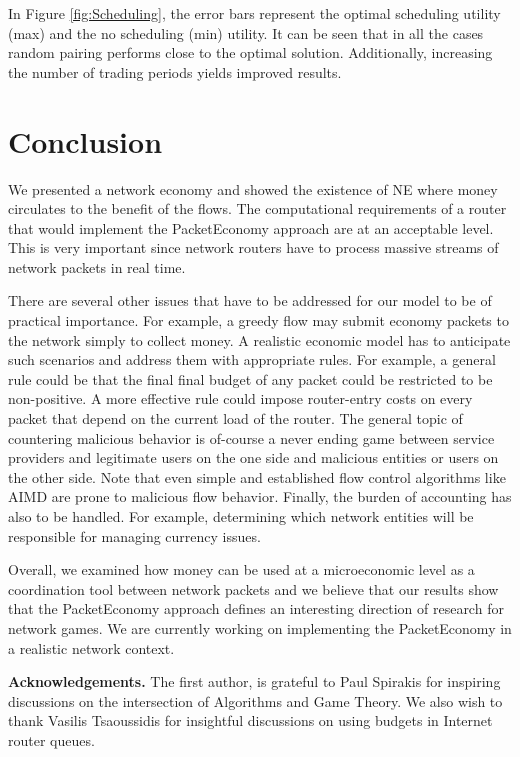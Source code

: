 \documentclass[letterpaper,10pt]{llncs}
\newcommand{\hla}[1]{\hl{#1}}
\renewcommand{\hla}[1]{#1}
\begin{document}
In Figure \ref{fig:Scheduling}, the error bars represent the optimal scheduling utility (max) and the no scheduling (min) utility. It can be seen that in all the cases random pairing performs close to the optimal solution. Additionally, increasing the number of trading periods yields improved results.
 
\section{Conclusion}
\label{sec:conclusion}
We presented a network economy and showed the existence of NE 
where money circulates to the benefit of the flows.
The computational requirements of a router that would implement
the PacketEconomy approach are at an acceptable level. This is very important
since network routers have to process massive streams of network packets in
real time.

There are several other issues that have to be addressed
for our model to be of practical importance. For example,
a greedy flow may submit economy packets to the network simply to collect
money. A realistic economic model has to anticipate such scenarios and address 
them with appropriate rules. For example, a general rule could be that the final 
final budget of any packet could be restricted to be non-positive. A more effective 
rule could impose router-entry costs on every packet that depend on the current load 
of the router. \hla{The general topic of countering malicious behavior is of-course 
a never ending game between service providers and legitimate users on the one side 
and malicious entities or users on the other side.
Note that even simple and established flow control algorithms like AIMD 
are prone to malicious flow behavior.}
Finally, the burden of accounting has also to be handled.
For example, determining which network entities will be responsible for managing currency 
issues.

Overall, we examined how money can be used at a microeconomic level 
as a coordination tool between network packets and we believe that 
our results show that the PacketEconomy approach defines an 
interesting direction of research for network games. We 
are currently working on implementing the PacketEconomy in a 
realistic network context.

\vspace{0.2cm}
\noindent
{\bf Acknowledgements.}
The first author, is grateful to Paul Spirakis for inspiring discussions on
the intersection of Algorithms and Game Theory. We also wish to thank Vasilis Tsaoussidis
for insightful discussions on using budgets in Internet router queues.
\end{document}
